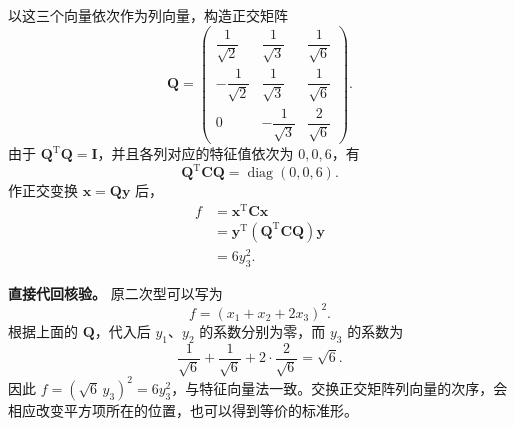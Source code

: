 \documentclass[UTF8,11pt,fontset=windows]{ctexart}
\begin{document}
以这三个向量依次作为列向量，构造正交矩阵
$$
\boxed{
\boldsymbol Q=
\begin{pmatrix}
\dfrac1{\sqrt2}&\dfrac1{\sqrt3}&\dfrac1{\sqrt6}\\[5pt]
-\dfrac1{\sqrt2}&\dfrac1{\sqrt3}&\dfrac1{\sqrt6}\\[5pt]
0&-\dfrac1{\sqrt3}&\dfrac2{\sqrt6}
\end{pmatrix}
}.
$$
由于 $\boldsymbol Q^{\mathrm T}\boldsymbol Q=\boldsymbol I$，并且各列对应的特征值依次为 $0,0,6$，有
$$
\boldsymbol Q^{\mathrm T}\boldsymbol C\boldsymbol Q
=\operatorname{diag}(0,0,6).
$$
作正交变换 $\boldsymbol x=\boldsymbol Q\boldsymbol y$ 后，
$$
\begin{aligned}
f
&=\boldsymbol x^{\mathrm T}\boldsymbol C\boldsymbol x\\
&=\boldsymbol y^{\mathrm T}
(\boldsymbol Q^{\mathrm T}\boldsymbol C\boldsymbol Q)
\boldsymbol y\\
&=\boxed{6y_3^2}.
\end{aligned}
$$

\textbf{直接代回核验。} 原二次型可以写为
$$
f=(x_1+x_2+2x_3)^2.
$$
根据上面的 $\boldsymbol Q$，代入后 $y_1$、$y_2$ 的系数分别为零，而 $y_3$ 的系数为
$$
\frac1{\sqrt6}+\frac1{\sqrt6}
+2\cdot\frac2{\sqrt6}=\sqrt6.
$$
因此 $f=(\sqrt6\,y_3)^2=6y_3^2$，与特征向量法一致。交换正交矩阵列向量的次序，会相应改变平方项所在的位置，也可以得到等价的标准形。
\end{document}
